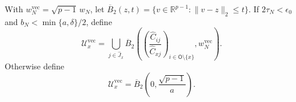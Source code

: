 With \(w_N^{\mathrm{vec}}=\sqrt{p-1}\,w_N\), let \(\overline B_2(z,t)=\{v\in\mathbb R^{p-1}:\lVert v-z\rVert_2\le t\}\). If \(2\tau_N<\epsilon_0\) and \(b_N<\min\{a,\delta\}/2\), define
\[
 \mathcal U_x^{\mathrm{vec}}
 =\bigcup_{j\in\widehat J_x}
 \overline B_2\!\left(
 \left(\frac{\widehat C_{ij}}{\widehat C_{xj}}\right)_{i\in\mathsf O\setminus\{x\}},
 w_N^{\mathrm{vec}}
 \right).
\]
Otherwise define
\[
 \mathcal U_x^{\mathrm{vec}}
 =\overline B_2\!\left(0,\frac{\sqrt{p-1}}a\right).
\]